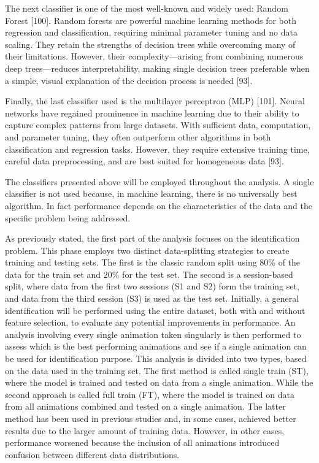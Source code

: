 \documentclass{article}
\begin{document}
The next classifier is one of the most well-known and widely used: Random Forest [100].
Random forests are powerful machine learning methods for both regression and classification, requiring minimal parameter tuning and no data scaling. 
They retain the strengths of decision trees while overcoming many of their limitations. 
However, their complexity—arising from combining numerous deep trees—reduces interpretability, making single decision trees preferable when a simple, visual explanation of the decision process is needed [93].

Finally, the last classifier used is the multilayer perceptron (MLP) [101]. 
Neural networks have regained prominence in machine learning due to their ability to capture complex patterns from large datasets. 
With sufficient data, computation, and parameter tuning, they often outperform other algorithms in both classification and regression tasks. 
However, they require extensive training time, careful data preprocessing, and are best suited for homogeneous data [93]. 

The classifiers presented above will be employed throughout the analysis. 
A single classifier is not used because, in machine learning, there is no universally best algorithm.
In fact performance depends on the characteristics of the data and the specific problem being addressed.

As previously stated, the first part of the analysis focuses on the identification problem. 
This phase employs two distinct data-splitting strategies to create training and testing sets. 
The first is the classic random split using 80\% of the data for the train set and 20\% for the test set.
The second is a session-based split, where data from the first two sessions (S1 and S2) form the training set, and data from the third session (S3) is used as the test set.
Initially, a general identification will be performed using the entire dataset, both with and without feature selection, to evaluate any potential improvements in performance.
An analysis involving every single animation taken singularly is then performed to assess which is the best performing animations and see if a single animation can be used for identification purpose.
This analysis is divided into two types, based on the data used in the training set.
The first method is called single train (ST), where the model is trained and tested on data from a single animation.
While the second approach is called full train (FT), where the model is trained on data from all animations combined and tested on a single animation.
The latter method has been used in previous studies and, in some cases, achieved better results due to the larger amount of training data. 
However, in other cases, performance worsened because the inclusion of all animations introduced confusion between different data distributions.
\end{document}
